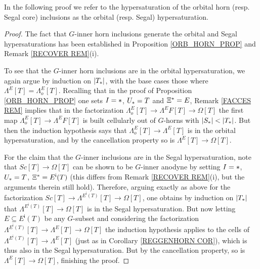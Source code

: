 \documentclass[a4paper,10pt
,draft
]{article}%
\begin{document}
In the following proof we refer to the hypersaturation
of the orbital horn (resp. Segal core) inclusions as the orbital (resp. Segal) hypersaturation.


\begin{proof}
	The fact that $G$-inner horn inclusions generate the orbital and Segal hypersaturations has been established in Proposition \ref{ORB_HORN_PROP} and Remark \ref{RECOVER REM}(i).
	
	To see that the $G$-inner horn inclusions are in the orbital hypersaturation, we again argue by induction on $|T_{\**}|$, with the base cases those where $\Lambda^{E} [T]=\Lambda^{E}_o [T]$.
	Recalling that in the proof of Proposition \ref{ORB_HORN_PROP}
	one sets
	$I=\**$, $U_{\**} = T$ and $\Xi^{\**} = E$,
	Remark \ref{FACCES REM} implies that in the factorization
	$\Lambda_o^E[T] \to \Lambda^EF[T] \to \Omega[T]$
	the first map $\Lambda_o^E[T] \to \Lambda^EF[T]$ is built cellularly out of $G$-horns with $|S_{\**}| < |T_{\**}|$.
	But then the induction hypothesis says that 
	$\Lambda_o^E[T] \to \Lambda^E[T]$ is in the orbital hypersaturation, and by the cancellation property so is $\Lambda^E[T] \to \Omega[T]$.
	
	For the claim that the $G$-inner inclusions are in the Segal hypersaturation,
	note that $Sc[T] \to \Omega[T]$ can be shown to be $G$-inner anodyne by setting $I=\**$, $U_{\**} = T$, $\Xi^{\**} = E^{\mathsf{i}}(T)$
	(this differs from Remark \ref{RECOVER REM}(i), but the arguments therein still hold).
	Therefore, arguing exactly as above for the factorization
	$Sc[T] \to \Lambda^{E^{\mathsf{i}}(T)}[T] \to \Omega[T]$,
	one obtains by induction on $|T_{\**}|$ that
	$\Lambda^{E^{\mathsf{i}}(T)}[T] \to \Omega[T]$
	is in the Segal hypersaturation. 
	But now letting $E \subseteq E^{\mathsf{i}}(T)$ be any $G$-subset and considering the factorization
	$\Lambda^{E^{\mathsf{i}}(T)}[T] \to 
	\Lambda^{E}[T] \to
	\Omega[T]$ the induction hypothesis applies to the cells of
	$\Lambda^{E^{\mathsf{i}}(T)}[T] \to \Lambda^{E}[T]$
	(just as in Corollary \ref{REGGENHORN COR}),
	which is thus also in the Segal hypersaturation.
	But by the cancellation property, so is 
	$\Lambda^{E}[T] \to \Omega[T]$, finishing the proof.
\end{proof}
\end{document}
